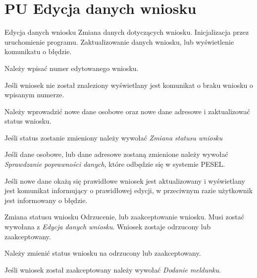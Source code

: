 \documentclass[12pt]{article}
\begin{document}
\section{PU Edycja danych wniosku}

\scenario
    {Edycja danych wniosku}
    {Zmiana danych dotyczących wniosku.}
    {Inicjalizacja przez uruchomienie programu.}
    {Zaktualizowanie danych wniosku, lub wyświetlenie komunikatu o błędzie.}
    {
        \item Należy wpisać numer edytowanego wniosku.
        \item Jeśli wniosek nie został znaleziony wyświetlany jest komunikat o braku wniosku o wpisanym numerze.
        \item Należy wprowadzić nowe dane osobowe oraz nowe dane adresowe i zaktualizować status wniosku.
        \item Jeśli status zostanie zmieniony należy wywołać \textit{Zmiana statusu wniosku}
        \item Jeśli dane osobowe, lub dane adresowe zostaną zmienione należy wywołać \textit{Sprawdzanie poprawności danych}, które odbędzie się w systemie PESEL.
        \item Jeśli nowe dane okażą się prawidłowe wniosek jest aktualizowany i wyświetlany jest komunikat informujący o prawidłowej edycji, w przeciwnym razie użytkownik jest informowany o błędzie.
    }

\scenario
    {Zmiana statusu wniosku}
    {Odrzucenie, lub zaakceptowanie wniosku.}
    {Musi zostać wywołana z \textit{Edycja danych wniosku}.}
    {Wniosek zostaje odrzucony lub zaakceptowany.}
    {
        \item Należy zmienić status wniosku na odrzucony lub zaakceptowany.
        \item Jeśli wniosek został zaakceptowany należy wywołać \textit{Dodanie meldunku}.
    }
\end{document}
